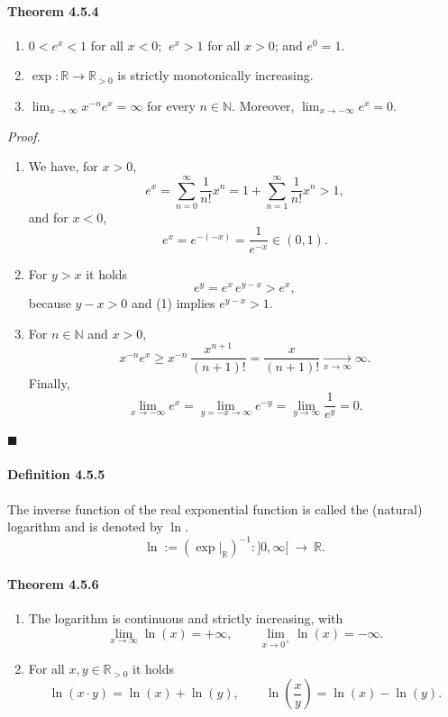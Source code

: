\documentclass[12pt]{article}
\begin{document}
	\paragraph{Theorem 4.5.4}
	\begin{enumerate}[label=({\arabic*})]
		\item $0 < e^{x} < 1$ for all $x<0$; $\ e^{x} > 1$ for all $x>0$; and $e^{0} = 1$.
		\item $\exp : \mathbb R \to \mathbb R_{>0}$ is strictly monotonically increasing.
		\item $\displaystyle\lim_{x\to\infty} x^{-n} e^{x} = \infty$ for every $n\in\mathbb N$. Moreover, $\displaystyle\lim_{x\to -\infty} e^{x} = 0$.
	\end{enumerate}

	\emph{Proof.}
	\begin{enumerate}[label=({\arabic*})]
		\item We have, for $x>0$,
		\[
			e^{x} = \sum_{n=0}^{\infty} \frac{1}{n!} x^{n} = 1 + \sum_{n=1}^{\infty} \frac{1}{n!} x^{n} > 1,
		\]
		and for $x<0$,
		\[
			e^{x} = e^{-(-x)} = \frac{1}{e^{-x}} \in (0,1).
		\]
		\item For $y>x$ it holds
		\[
			e^{y} = e^{x}\,e^{y-x} > e^{x},
		\]
		because $y-x>0$ and (1) implies $e^{y-x}>1$.
		\item For $n\in\mathbb N$ and $x>0$,
		\[
			x^{-n} e^{x} \ge x^{-n}\,\frac{x^{n+1}}{(n+1)!} = \frac{x}{(n+1)!} \xrightarrow[x\to\infty]{} \infty.
		\]
		Finally,
		\[
			\lim_{x\to-\infty} e^{x} = \lim_{y=-x\to\infty} e^{-y} = \lim_{y\to\infty} \frac{1}{e^{y}} = 0.
		\]
	\end{enumerate}
	\hfill $\blacksquare$



	\paragraph{Definition 4.5.5} The inverse function of the real exponential function is called the (natural) logarithm and is denoted by $\ln$.
	\[
		\ln := (\exp|_{\mathbb R})^{-1} : ]0,\infty[\ \to\ \mathbb R.
	\]

	\paragraph{Theorem 4.5.6}
	\begin{enumerate}[label=({\arabic*})]
		\item The logarithm is continuous and strictly increasing, with
		\[
			\lim_{x\to\infty} \ln(x) = +\infty,\qquad
			\lim_{x\to 0^{+}} \ln(x) = -\infty.
		\]
		\item For all $x,y \in \mathbb R_{>0}$ it holds
		\[
			\ln(x\cdot y) = \ln(x) + \ln(y),\qquad
			\ln\!\left(\frac{x}{y}\right) = \ln(x) - \ln(y).
		\]
	\end{enumerate}
\end{document}
